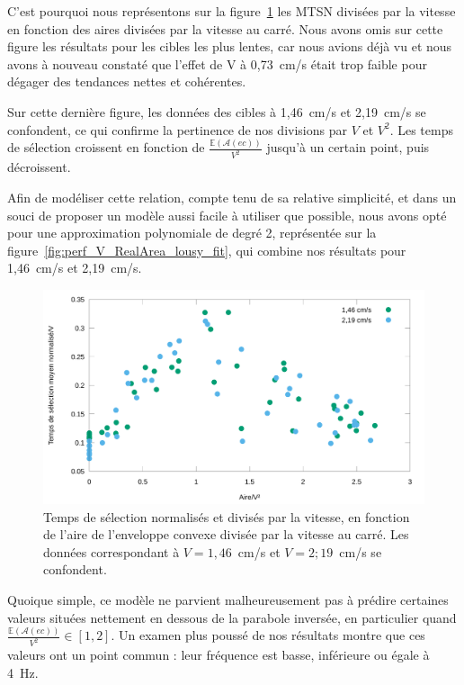	C'est pourquoi nous représentons sur la figure~\ref{fig:perf_V_RealArea_normed} les MTSN divisées par la vitesse en fonction des aires divisées par la vitesse au carré. Nous avons omis sur cette figure les résultats pour les cibles les plus lentes, car nous avions déjà vu et nous avons à nouveau constaté que l'effet de V à 0,73~cm/s était trop faible pour dégager des tendances nettes et cohérentes.
	
	Sur cette dernière figure, les données des cibles à 1,46~cm/s et 2,19~cm/s se confondent, ce qui confirme la pertinence de nos divisions par $V$ et $V^{2}$. Les temps de sélection croissent en fonction de $\frac{\mathbb{E}(\mathcal{A}(ec))}{V^{2}}$ jusqu'à un certain point, puis décroissent.
	
	Afin de modéliser cette relation, compte tenu de sa relative simplicité, et dans un souci de proposer un modèle aussi facile à utiliser que possible, nous avons opté pour une approximation polynomiale de degré 2, représentée sur la figure~\ref{fig:perf_V_RealArea_lousy_fit}, qui combine nos résultats pour 1,46~cm/s et 2,19~cm/s.
	
	\begin{figure}[!htbp]
		\centering
		\includegraphics[width=\textwidth]{figures/ch4/perf_V_RealArea_normed}
		\caption[MTSN/V en fonction de l'aire/V²]{Temps de sélection normalisés et divisés par la vitesse, en fonction de l'aire de l'enveloppe convexe divisée par la vitesse au carré. Les données correspondant à $V = 1,46$~cm/s et $V = 2;19$~cm/s se confondent.}
		\label{fig:perf_V_RealArea_normed}
	\end{figure}
	
	Quoique simple, ce modèle ne parvient malheureusement pas à prédire certaines valeurs situées nettement en dessous de la parabole inversée, en particulier quand $\frac{\mathbb{E}(\mathcal{A}(ec))}{V^{2}} \in [1,2]$. Un examen plus poussé de nos résultats montre que ces valeurs ont un point commun : leur fréquence est basse, inférieure ou égale à 4~Hz.
	
